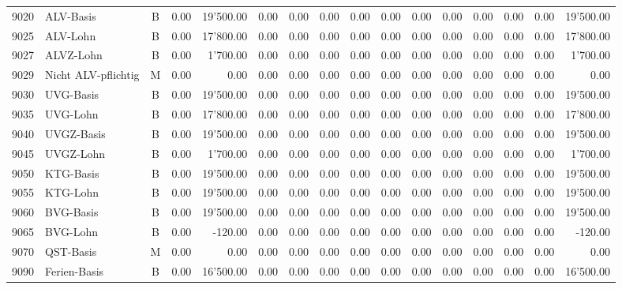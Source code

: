 \documentclass[8pt,a4paper]{extarticle}
\begin{document}
\begin{longtable}{@{\extracolsep{\fill}} l l c r r r r r r r r r r r r r}
9020&ALV-Basis&B&0.00&19'500.00&0.00&0.00&0.00&0.00&0.00&0.00&0.00&0.00&0.00&0.00&19'500.00\\
9025&ALV-Lohn&B&0.00&17'800.00&0.00&0.00&0.00&0.00&0.00&0.00&0.00&0.00&0.00&0.00&17'800.00\\
9027&ALVZ-Lohn&B&0.00&1'700.00&0.00&0.00&0.00&0.00&0.00&0.00&0.00&0.00&0.00&0.00&1'700.00\\
9029&Nicht ALV-pflichtig&M&0.00&0.00&0.00&0.00&0.00&0.00&0.00&0.00&0.00&0.00&0.00&0.00&0.00\\
9030&UVG-Basis&B&0.00&19'500.00&0.00&0.00&0.00&0.00&0.00&0.00&0.00&0.00&0.00&0.00&19'500.00\\
9035&UVG-Lohn&B&0.00&17'800.00&0.00&0.00&0.00&0.00&0.00&0.00&0.00&0.00&0.00&0.00&17'800.00\\
9040&UVGZ-Basis&B&0.00&19'500.00&0.00&0.00&0.00&0.00&0.00&0.00&0.00&0.00&0.00&0.00&19'500.00\\
9045&UVGZ-Lohn&B&0.00&1'700.00&0.00&0.00&0.00&0.00&0.00&0.00&0.00&0.00&0.00&0.00&1'700.00\\
9050&KTG-Basis&B&0.00&19'500.00&0.00&0.00&0.00&0.00&0.00&0.00&0.00&0.00&0.00&0.00&19'500.00\\
9055&KTG-Lohn&B&0.00&19'500.00&0.00&0.00&0.00&0.00&0.00&0.00&0.00&0.00&0.00&0.00&19'500.00\\
9060&BVG-Basis&B&0.00&19'500.00&0.00&0.00&0.00&0.00&0.00&0.00&0.00&0.00&0.00&0.00&19'500.00\\
9065&BVG-Lohn&B&0.00&-120.00&0.00&0.00&0.00&0.00&0.00&0.00&0.00&0.00&0.00&0.00&-120.00\\
9070&QST-Basis&M&0.00&0.00&0.00&0.00&0.00&0.00&0.00&0.00&0.00&0.00&0.00&0.00&0.00\\
9090&Ferien-Basis&B&0.00&16'500.00&0.00&0.00&0.00&0.00&0.00&0.00&0.00&0.00&0.00&0.00&16'500.00\\

\end{longtable}
\pagebreak
\end{document}
